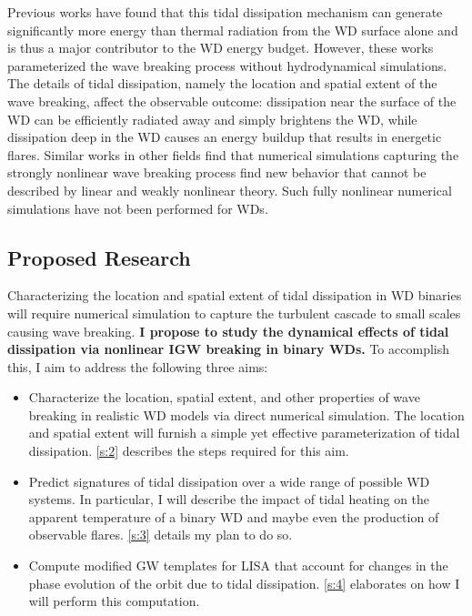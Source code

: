 \documentclass[12pt,
        usenames, %
        dvipsnames %
    ]{article}
\begin{document}
Previous works have found that this tidal dissipation mechanism can generate
significantly more energy than thermal radiation from the WD surface alone and
is thus a major contributor to the WD energy budget\cite{fullerII,fullerIV}.
However, these works parameterized the wave breaking process without
hydrodynamical simulations. The details of tidal dissipation, namely the
location and spatial extent of the wave breaking, affect the observable outcome:
dissipation near the surface of the WD can be efficiently radiated away and
simply brightens the WD, while dissipation deep in the WD causes an energy
buildup that results in energetic flares\cite{tidal_novae}. Similar works in
other fields find that numerical simulations capturing the strongly nonlinear
wave breaking process find new behavior that cannot be described by linear and
weakly nonlinear theory\cite{winters1994,barker_ogilvie}. Such fully nonlinear
numerical simulations have not been performed for WDs.

\subsection{Proposed Research}

Characterizing the location and spatial extent of tidal dissipation in WD
binaries will require numerical simulation to capture the turbulent cascade to
small scales causing wave breaking. \textbf{I propose to study the dynamical
effects of tidal dissipation via nonlinear IGW breaking in binary WDs.} To
accomplish this, I aim to address the following three aims:
\begin{itemize}
    \item Characterize the location, spatial extent, and other properties of
        wave breaking in realistic WD models via direct numerical simulation.
        The location and spatial extent will furnish a simple yet effective
        parameterization of tidal dissipation. \autoref{s:2} describes the
        steps required for this aim.

    \item Predict signatures of tidal dissipation over a wide range of possible
        WD systems. In particular, I will describe the impact of tidal heating
        on the apparent temperature of a binary WD and maybe even the production
        of observable flares. \autoref{s:3} details my plan to do so.

    \item Compute modified GW templates for LISA that account for changes in the
        phase evolution of the orbit due to tidal dissipation. \autoref{s:4}
        elaborates on how I will perform this computation.
\end{itemize}
\end{document}
